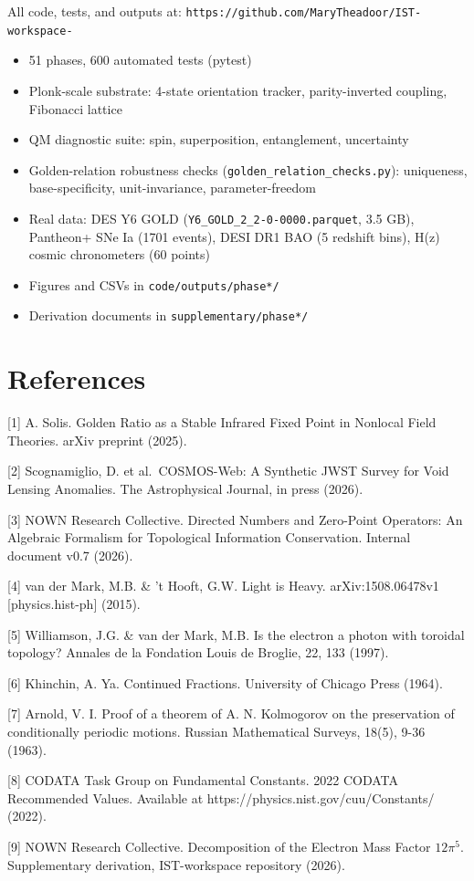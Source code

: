 \documentclass[
  11pt,
]{article}
\providecommand{\tightlist}{%
  \setlength{\itemsep}{0pt}\setlength{\parskip}{0pt}}
\begin{document}
All code, tests, and outputs at:
\texttt{https://github.com/MaryTheadoor/IST-workspace-}

\begin{itemize}
\tightlist
\item
  51 phases, 600 automated tests (pytest)
\item
  Plonk-scale substrate: 4-state orientation tracker, parity-inverted
  coupling, Fibonacci lattice
\item
  QM diagnostic suite: spin, superposition, entanglement, uncertainty
\item
  Golden-relation robustness checks
  (\texttt{golden\_relation\_checks.py}): uniqueness, base-specificity,
  unit-invariance, parameter-freedom
\item
  Real data: DES Y6 GOLD (\texttt{Y6\_GOLD\_2\_2-0-0000.parquet}, 3.5
  GB), Pantheon+ SNe Ia (1701 events), DESI DR1 BAO (5 redshift bins),
  H(z) cosmic chronometers (60 points)
\item
  Figures and CSVs in \texttt{code/outputs/phase*/}
\item
  Derivation documents in \texttt{supplementary/phase*/}
\end{itemize}

\section{References}\label{references}

{[}1{]} A. Solis. Golden Ratio as a Stable Infrared Fixed Point in
Nonlocal Field Theories. arXiv preprint (2025).

{[}2{]} Scognamiglio, D. et al.~COSMOS-Web: A Synthetic JWST Survey for
Void Lensing Anomalies. The Astrophysical Journal, in press (2026).

{[}3{]} NOWN Research Collective. Directed Numbers and Zero-Point
Operators: An Algebraic Formalism for Topological Information
Conservation. Internal document v0.7 (2026).

{[}4{]} van der Mark, M.B. \& 't Hooft, G.W. Light is Heavy.
arXiv:1508.06478v1 {[}physics.hist-ph{]} (2015).

{[}5{]} Williamson, J.G. \& van der Mark, M.B. Is the electron a photon
with toroidal topology? Annales de la Fondation Louis de Broglie, 22,
133 (1997).

{[}6{]} Khinchin, A. Ya. Continued Fractions. University of Chicago
Press (1964).

{[}7{]} Arnold, V. I. Proof of a theorem of A. N. Kolmogorov on the
preservation of conditionally periodic motions. Russian Mathematical
Surveys, 18(5), 9-36 (1963).

{[}8{]} CODATA Task Group on Fundamental Constants. 2022 CODATA
Recommended Values. Available at https://physics.nist.gov/cuu/Constants/
(2022).

{[}9{]} NOWN Research Collective. Decomposition of the Electron Mass
Factor \(12\pi^5\). Supplementary derivation, IST-workspace repository
(2026).
\end{document}
